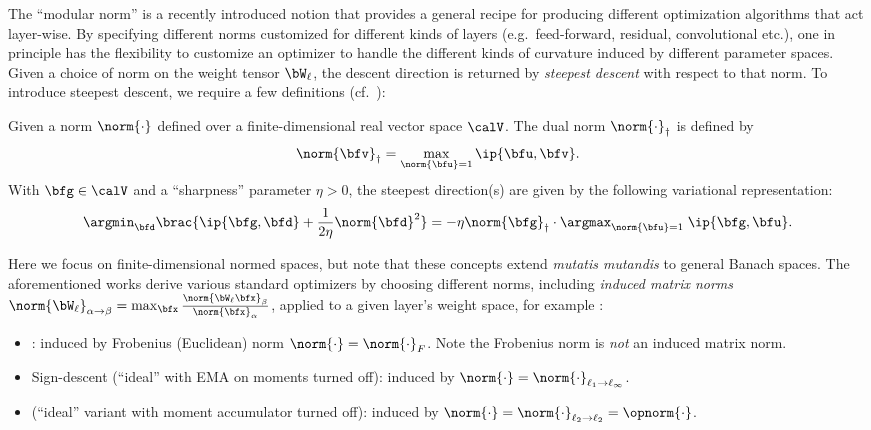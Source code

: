 The ``modular norm'' \cite{large2024scalable, bernstein2024modular, bernstein2024old} is a recently introduced notion that provides a general recipe for producing different optimization algorithms that act layer-wise. By specifying different norms customized for different kinds of layers (e.g.\ feed-forward, residual, convolutional etc.), one in principle has the flexibility to customize an optimizer to handle the different kinds of curvature induced by different parameter spaces. Given a choice of norm on the weight tensor $\bW_\ell$, the descent direction is returned by \textit{steepest descent} with respect to that norm. To introduce steepest descent, we require a few definitions (cf.\ \citet{bernstein2024modular}):
\begin{definition}
    Given a norm $\norm{\cdot}$ defined over a finite-dimensional real vector space $\calV$. The dual norm $\norm{\cdot}_\dagger$ is defined by
    \begin{align*}
        \norm{\bfv}_\dagger = \max_{\norm{\bfu} = 1} \ip{\bfu,\bfv}.
    \end{align*}
    With $\bfg \in \calV$ and a ``sharpness'' parameter $\eta > 0$, the steepest direction(s) are given by the following variational representation:
    \begin{align*}
        \argmin_{\bfd} \brac{\ip{\bfg, \bfd} + \frac{1}{2\eta} \norm{\bfd}^2} = -\eta\norm{\bfg}_\dagger \cdot \argmax_{\norm{\bfu}=1} \;\ip{\bfg, \bfu}.
    \end{align*}
\end{definition}
Here we focus on finite-dimensional normed spaces, but note that these concepts extend \emph{mutatis mutandis} to general Banach spaces. The aforementioned works derive various standard optimizers by choosing different norms, including \emph{induced matrix norms} $\norm{\bW_\ell}_{\alpha \to \beta} = \max_{\bfx} \frac{\norm{\bW_\ell \bfx}_\beta}{\norm{\bfx}_\alpha}$, applied to a given layer's weight space, for example \cite{bernstein2024old}:
\begin{itemize}
    \item \SGD: induced by Frobenius (Euclidean) norm $\norm{\cdot} = \norm{\cdot}_F$. Note the Frobenius norm is \emph{not} an induced matrix norm.
    
    \item Sign-descent (``ideal'' \Adam with EMA on moments turned off): induced by $\norm{\cdot} = \norm{\cdot}_{\ell_1 \to \ell_\infty}$.

    \item \Shampoo (``ideal'' variant with moment accumulator turned off): induced by $\norm{\cdot} = \norm{\cdot}_{\ell_2 \to \ell_2} =  \opnorm{\cdot}$.
    
\end{itemize}

